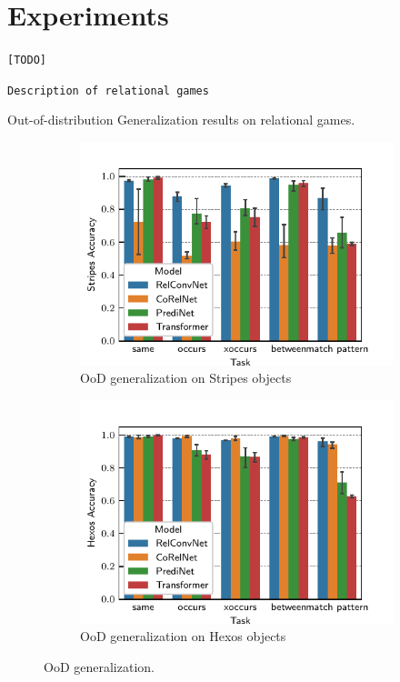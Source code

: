 \section{Experiments}\label{sec:experiments}

\texttt{[TODO]}

\texttt{Description of relational games}

\begin{table}
    \centering
    
    \caption{Out-of-distribution Generalization results on relational games.}
\end{table}

\begin{figure}
    \begin{subfigure}{0.5\textwidth}
        \centering
        \includegraphics[width=\textwidth]{figs/experiments/stripes_acc.pdf}
        \caption{OoD generalization on Stripes objects}
    \end{subfigure}
    \begin{subfigure}{0.5\textwidth}
        \centering
        \includegraphics[width=\textwidth]{figs/experiments/hexos_acc.pdf}
        \caption{OoD generalization on Hexos objects}
    \end{subfigure}
    \caption{OoD generalization.}\label{fig:ood_generalization}
\end{figure}